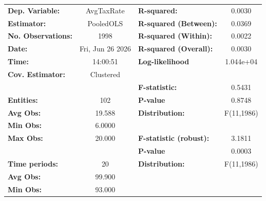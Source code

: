\begin{center}
\begin{tabular}{lclc}
\toprule
\textbf{Dep. Variable:}                            &     AvgTaxRate     & \textbf{  R-squared:         }   &      0.0030      \\
\textbf{Estimator:}                                &     PooledOLS      & \textbf{  R-squared (Between):}  &      0.0369      \\
\textbf{No. Observations:}                         &        1998        & \textbf{  R-squared (Within):}   &      0.0022      \\
\textbf{Date:}                                     &  Fri, Jun 26 2026  & \textbf{  R-squared (Overall):}  &      0.0030      \\
\textbf{Time:}                                     &      14:00:51      & \textbf{  Log-likelihood     }   &    1.044e+04     \\
\textbf{Cov. Estimator:}                           &     Clustered      & \textbf{                     }   &                  \\
\textbf{}                                          &                    & \textbf{  F-statistic:       }   &      0.5431      \\
\textbf{Entities:}                                 &        102         & \textbf{  P-value            }   &      0.8748      \\
\textbf{Avg Obs:}                                  &       19.588       & \textbf{  Distribution:      }   &    F(11,1986)    \\
\textbf{Min Obs:}                                  &       6.0000       & \textbf{                     }   &                  \\
\textbf{Max Obs:}                                  &       20.000       & \textbf{  F-statistic (robust):} &      3.1811      \\
\textbf{}                                          &                    & \textbf{  P-value            }   &      0.0003      \\
\textbf{Time periods:}                             &         20         & \textbf{  Distribution:      }   &    F(11,1986)    \\
\textbf{Avg Obs:}                                  &       99.900       & \textbf{                     }   &                  \\
\textbf{Min Obs:}                                  &       93.000       & \textbf{                     }   &                  \\

\end{tabular}
\end{center}

